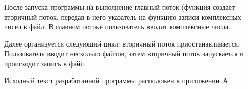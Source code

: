 После запуска программы на выполнение главный поток (функция создаёт вторичный поток, передав в него указатель на функцию записи комплексных чисел в файл. В главном потоке пользователь вводит комплексные числа.

Далее организуется следующий цикл: вторичный поток приостанавливается. Пользователь вводит несколько файлов, затем вторичный поток запускается и происходит запись в файл.

Исходный текст разработанной программы расположен в приложении~А.

\newpage
